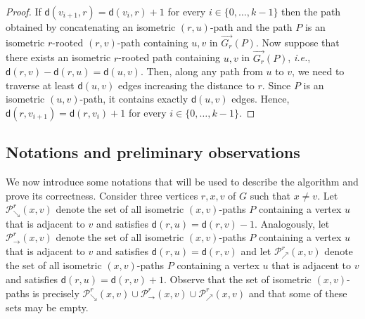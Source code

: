 \documentclass[a4paper]{article}
\newcommand{\dist}[2]{\mathsf{d}\left(#1,#2\right)}
\newcommand{\ie}{\textit{i.e.\xspace}}
\newcommand{\pathseta}[3]{\mathcal{P}_{\searrow}^{#1}\left(#2,#3\right)}
\newcommand{\pathseteq}[3]{\mathcal{P}_{\rightarrow}^{#1}\left(#2,#3\right)}
\newcommand{\pathsetd}[3]{\mathcal{P}_{\nearrow}^{#1}\left(#2,#3\right)}
\begin{document}
\begin{proof}
  If $\dist{v_{i+1}}{r}= \dist{v_i}{r}+1$ for every
  $i\in \{0,\dots,k-1\}$ then the path obtained by concatenating an
  isometric $(r,u)$-path and the path $P$ is an isometric $r$-rooted
  $(r,v)$-path containing $u, v$ in $\overrightarrow{G_r}(P)$.  Now
  suppose that there exists an isometric $r$-rooted path containing
  $u, v$ in $\overrightarrow{G_r}(P)$, \ie,
  $\dist{r}{v}-\dist{r}{u}=\dist{u}{v}.$ Then, along any path from $u$
  to $v$, we need to traverse at least $\dist{u}{v}$ edges increasing
  the distance to $r$. Since $P$ is an isometric $(u,v)$-path, it
  contains exactly $\dist{u}{v}$ edges. Hence,
  $\dist{r}{v_{i+1}}=\dist{r}{v_i}+1$ for every
  $i\in \{0,\dots,k-1\}$.
\end{proof}

\subsection{Notations and preliminary observations}


We now introduce some notations that will be used to describe the
algorithm and prove its correctness.  Consider three vertices $r,x,v$
of $G$ such that $x \neq v$. Let $\pathseta{r}{x}{v}$ denote the set
of all isometric $(x,v)$-paths $P$ containing a vertex $u$ that is
adjacent to $v$ and satisfies
$\dist{r}{u}=\dist{r}{v}-1$. Analogously, let $\pathseteq{r}{x}{v}$
denote the set of all isometric $(x,v)$-paths $P$ containing a vertex
$u$ that is adjacent to $v$ and satisfies $\dist{r}{u}=\dist{r}{v}$
and let $\pathsetd{r}{x}{v}$ denote the set of all isometric
$(x,v)$-paths $P$ containing a vertex $u$ that is adjacent to $v$ and
satisfies $\dist{r}{u}=\dist{r}{v}+1$. Observe that the set of
isometric $(x,v)$-paths is precisely
$\pathseta{r}{x}{v} \cup \pathseteq{r}{x}{v} \cup \pathsetd{r}{x}{v}$
and that some of these sets may be empty.
\end{document}
